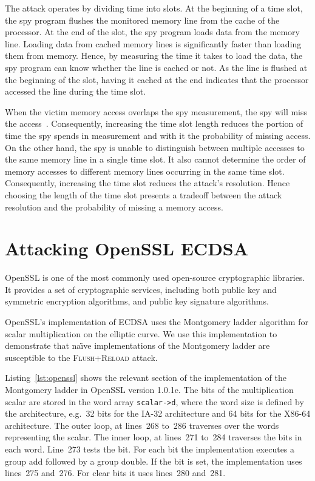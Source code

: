 \documentclass[twocolumn]{svjour3}
\newcommand{\fl}{\textsc{Flu\-sh+\allowbreak Re\-load}\xspace}
\newcommand{\myupcase}[1]{\uppercase{#1}}
\begin{document}
The attack operates by dividing time into slots.  
At the beginning of a time slot, the spy program flushes the monitored memory line from the cache of the processor.
At the end of the slot, the spy program loads data from the memory line.
Loading data from cached memory lines is significantly faster than loading them from memory.
Hence, by measuring the time it takes to load the data, the spy program can know whether the line is cached or not.
As the line is flushed at the beginning of the slot, having it cached at the end indicates that the processor accessed
the line during the time slot.

When the victim memory access overlaps the spy measurement, the spy will miss the access~\cite{yarom13flush}.
Consequently, increasing the time slot length reduces the portion of time the spy spends in
measurement and with it the probability of missing access.
On the other hand, the spy is unable to distinguish between multiple accesses to the same memory line in 
a single time slot.
It also cannot determine the order of memory accesses to different memory lines occurring in the same time slot.
Consequently, increasing the time slot reduces the attack's resolution.
Hence choosing the length of the time slot presents a tradeoff between the attack resolution
and the probability of missing a memory access.


\section{Attacking OpenSSL ECDSA}\label{sec:attack}
OpenSSL is one of the most commonly used  open-source cryptographic libraries.
It provides a set of cryptographic services, including both public key and symmetric encryption 
algorithms, and public key signature algorithms.

OpenSSL's implementation of \myupcase{ecdsa} uses the Montgomery ladder algorithm for scalar multiplication
on the elliptic curve.
We use this implementation to demonstrate that na{\"\i}ve implementations of the Montgomery ladder are
susceptible to the \fl attack.

Listing~\ref{lst:openssl} shows the relevant section of the implementation of the Montgomery ladder in OpenSSL version 1.0.1e.
The bits of the multiplication scalar are stored in the word array \texttt{scalar->d},
where the word size is defined by the architecture, e.g.\ 32 bits for the IA-32 architecture and 64 bits for the X86-64 architecture.
The outer loop, at lines~268 to~286 traverses over the words representing the scalar.
The inner loop, at lines~271 to~284 traverses the bits in each word.
Line~273 tests the bit. 
For each bit the implementation executes a group add followed by a group double.
If the bit is set, the implementation uses lines~275 and~276.
For clear bits it uses lines~280 and~281.
\end{document}
